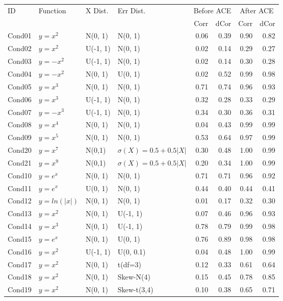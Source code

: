 \documentclass[a4paper,fleqn]{cas-sc}
\begin{document}
\begin{center}
\label{tab:results_summary}
\begin{tabular}{@{}llllrrrr@{}}
\toprule
ID & Function & X Dist. & Err Dist. & \multicolumn{2}{c}{Before ACE} & \multicolumn{2}{c}{After ACE} \\
\cmidrule(lr){5-6} \cmidrule(lr){7-8}
& & & & Corr & dCor & Corr & dCor \\ \midrule
Cond01 & $y=x^{2}$ & N(0, 1) & N(0, 1) & 0.06 & 0.39 & 0.90 & 0.82 \\
Cond02 & $y=x^{2}$ & U(-1, 1) & N(0, 1) & 0.02 & 0.14 & 0.29 & 0.27 \\
Cond03 & $y=-x^{2}$ & U(-1, 1) & N(0, 1) & 0.02 & 0.14 & 0.30 & 0.28 \\
Cond04 & $y=-x^{2}$ & N(0, 1) & U(0, 1) & 0.02 & 0.52 & 0.99 & 0.98 \\
Cond05 & $y=x^{3}$ & N(0, 1) & N(0, 1) & 0.71 & 0.74 & 0.96 & 0.93 \\
Cond06 & $y=x^{3}$ & U(-1, 1) & N(0, 1) & 0.32 & 0.28 & 0.33 & 0.29 \\
Cond07 & $y=-x^{3}$ & U(-1, 1) & N(0, 1) & 0.34 & 0.30 & 0.36 & 0.31 \\
Cond08 & $y=x^{4}$ & N(0, 1) & N(0, 1) & 0.04 & 0.43 & 0.99 & 0.99 \\
Cond09 & $y=x^{5}$ & N(0, 1) & N(0, 1) & 0.53 & 0.64 & 0.97 & 0.99 \\
Cond20 & $y=x^{7}$  & N(0,1) & $\sigma(X)=0.5+0.5|X|$ & 0.30 & 0.48 & 1.00 & 0.99 \\
Cond21 & $y=x^{9}$  & N(0,1) & $\sigma(X)=0.5+0.5|X|$ & 0.20 & 0.34 & 1.00 & 0.99 \\
Cond10 & $y=e^{x}$ & N(0, 1) & N(0, 1) & 0.71 & 0.71 & 0.96 & 0.92 \\
Cond11 & $y=e^{x}$ & U(0, 1) & N(0, 1) & 0.44 & 0.40 & 0.44 & 0.41 \\
Cond12 & $y=ln(|x|)$ & N(0, 1) & N(0, 1) & 0.01 & 0.17 & 0.32 & 0.30 \\
Cond13 & $y=x^{2}$ & N(0, 1) & U(-1, 1) & 0.07 & 0.46 & 0.96 & 0.93 \\
Cond14 & $y=x^{3}$ & N(0, 1) & U(-1, 1) & 0.78 & 0.79 & 0.99 & 0.98 \\
Cond15 & $y=e^{x}$ & N(0, 1) & U(0, 1) & 0.76 & 0.89 & 0.98 & 0.98 \\
Cond16 & $y=x^{2}$ & U(-1, 1) & U(0, 0.1) & 0.04 & 0.48 & 1.00 & 0.99 \\ 
Cond17 & $y=x^{2}$ & N(0, 1) & t(df=3) & 0.12 & 0.33 & 0.61 & 0.64 \\
Cond18 & $y=x^{2}$ & N(0, 1) & Skew-N(4) & 0.15 & 0.45 & 0.78 & 0.85 \\
Cond19 & $y=x^{2}$ & N(0, 1) & Skew-t(3,4) & 0.10 & 0.38 & 0.65 & 0.71 \\ \bottomrule
\end{tabular}
\end{center}
\end{document}
